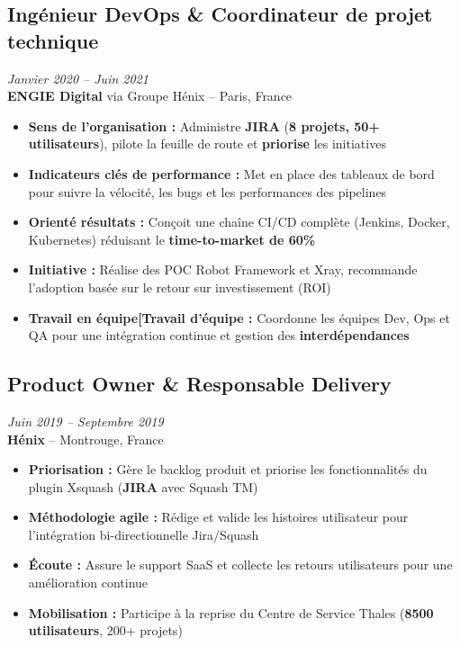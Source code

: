 \documentclass[11pt,a4paper]{article}
\newcommand{\highlight}[1]{\textcolor{primaryblue}{\textbf{#1}}}
\newcommand{\keypoint}[1]{\textbf{#1}}
\begin{document}
\subsection*{Ingénieur DevOps \& Coordinateur de projet technique} \hfill \textit{\color{mediumgray}Janvier 2020 -- Juin 2021}\\
\textcolor{primaryblue}{\textbf{ENGIE Digital}} via Groupe Hénix -- Paris, France
\begin{itemize}[leftmargin=22pt]
    \item \highlight{Sens de l'organisation :} Administre \highlight{JIRA} (\keypoint{8 projets, 50+ utilisateurs}), pilote la feuille de route et \highlight{priorise} les initiatives
    \item \highlight{Indicateurs clés de performance :} Met en place des tableaux de bord pour suivre la vélocité, les bugs et les performances des pipelines
    \item \highlight{Orienté résultats :} Conçoit une chaîne CI/CD complète (Jenkins, Docker, Kubernetes) réduisant le \keypoint{time-to-market de 60\%}
    \item \highlight{Initiative :} Réalise des POC Robot Framework et Xray, recommande l'adoption basée sur le retour sur investissement (ROI)
    \item \highlight{Travail en équipe[Travail d'équipe :} Coordonne les équipes Dev, Ops et QA pour une intégration continue et gestion des \highlight{interdépendances}
\end{itemize}

\subsection*{Product Owner \& Responsable Delivery} \hfill \textit{\color{mediumgray}Juin 2019 -- Septembre 2019}\\
\textcolor{primaryblue}{\textbf{Hénix}} -- Montrouge, France
\begin{itemize}[leftmargin=22pt]
    \item \highlight{Priorisation :} Gère le backlog produit et priorise les fonctionnalités du plugin Xsquash (\highlight{JIRA} avec Squash TM)
    \item \highlight{Méthodologie agile :} Rédige et valide les histoires utilisateur pour l'intégration bi-directionnelle Jira/Squash
    \item \highlight{Écoute :} Assure le support SaaS et collecte les retours utilisateurs pour une amélioration continue
    \item \highlight{Mobilisation :} Participe à la reprise du Centre de Service Thales (\keypoint{8500 utilisateurs}, 200+ projets)
\end{itemize}
\end{document}

